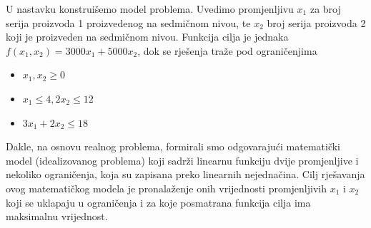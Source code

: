 \documentclass[b5paper, utf8, 11pt, colorlinks]{book}
\theoremstyle{definition}
\begin{document}
\begin{table}[!ht]
    \centering
    \caption{Procjene konstanti modela.}
    \label{tab:procjene-1}
\end{table}

U nastavku konstruišemo model problema. Uvedimo promjenljivu $x_1$ za broj serija proizvoda 1 proizvedenog na sedmičnom nivou, te $x_2$ broj serija proizvoda 2 koji je proizveden na sedmičnom nivou. Funkcija cilja je jednaka $f(x_1, x_2) = 3000 x_1 + 5000 x_2$, dok se rješenja traže pod ograničenjima
\begin{itemize}
     \item $x_1, x_2 \geq 0$ 
     \item  $x_1 \leq 4, 2 x_2 \leq 12$
    \item $3 x_1 + 2 x_2 \leq 18$
\end{itemize}

Dakle, na osnovu realnog problema, formirali smo odgovarajući matematički model (idealizovanog problema) koji sadrži  linearnu funkciju dvije promjenljive i nekoliko ograničenja, koja su zapisana preko linearnih nejednačina. Cilj rješavanja ovog matematičkog modela je pronalaženje onih vrijednosti promjenljivih $x_1$ i $x_2$ koji se uklapaju u ograničenja i za koje posmatrana funkcija cilja ima maksimalnu vrijednost.

\end{document}
